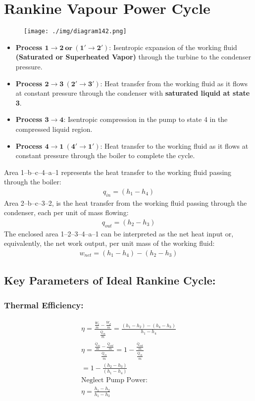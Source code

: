 \section{Rankine Vapour Power Cycle}
\begin{figure}[H]
  \centering
  \texttt{[image: ./img/diagram142.png]}
  \caption{}
\end{figure}
\begin{itemize}[noitemsep]
  \item \textbf{Process $\mathbf{1\rightarrow 2 \ \text{or} \ (1'\rightarrow 2')}$}: Isentropic expansion of the working fluid \textbf{(Saturated or Superheated Vapor)} through the turbine to the condenser pressure.
  \item \textbf{Process $\mathbf{2\rightarrow 3 \ (2'\rightarrow 3')}$}: Heat transfer from the working fluid as it flows at constant pressure through the condenser with \textbf{saturated liquid at state 3}.
  \item \textbf{Process $\mathbf{3\rightarrow 4}$}: Isentropic compression in the pump to state 4 in the compressed liquid region.
  \item \textbf{Process $\mathbf{4\rightarrow 1 \ (4'\rightarrow 1')}$}: Heat transfer to the working fluid as it flows at constant pressure through the boiler to complete the cycle.
\end{itemize}
Area 1–b–c–4–a–1 represents the heat transfer to the working fluid passing through the boiler:
\begin{gather}
  q_{in}=(h_1-h_4)
\end{gather}
Area 2–b–c–3–2, is the heat transfer from the working fluid passing through the condenser, each per unit of mass flowing:
\begin{gather}
  q_{out}=(h_2-h_3)
\end{gather}
The enclosed area 1–2–3–4–a–1 can be interpreted as the net heat input or, equivalently, the net work output, per unit mass of the working fluid:
\begin{gather}
  w_{net}=(h_1-h_4)-(h_2-h_3)
\end{gather}
\subsection{Key Parameters of Ideal Rankine Cycle:}
\subsubsection{Thermal Efficiency:}
\begin{gather}
  \eta = \frac{\frac{\dot{W}_t}{\dot{m}} - \frac{\dot{W}_p}{\dot{m}}}{\frac{\dot{Q}_{in}}{\dot{m}}} = \frac{(h_1-h_2)-(h_4-h_3)}{h_1-h_4} \\[5pt]
  \eta = \frac{\frac{\dot{Q}_{in}}{\dot{m}} - \frac{\dot{Q}_{out}}{\dot{m}}}{\frac{\dot{Q}_{in}}{\dot{m}}} = 1-\frac{\frac{\dot{Q}_{out}}{\dot{m}}}{\frac{\dot{Q}_{in}}{\dot{m}}} \\[5pt]
  = 1-\frac{(h_2-h_3)}{(h_1-h_4)} \\[5pt]
  \text{Neglect Pump Power:} \\[5pt]
  \eta = \frac{h_1-h_2}{h_1-h_3}
\end{gather}
